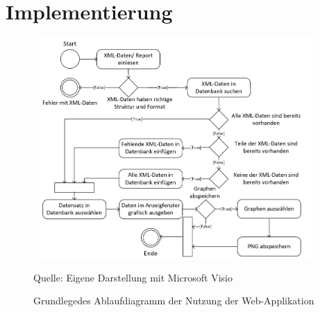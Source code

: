 
\newpage
\section{Implementierung}
\label{sec:implementierung}

\begin{figure}[H]
    \centering
    \includegraphics[width=0.95\textwidth]{Grafiken/Ablaufdiagramm}
    \caption{Grundlegedes Ablaufdiagramm der Nutzung der Web-Applikation}
    \label{fig: Grundlegedes Ablaufdiagramm der Nutzung der Web-Applikation}
    {Quelle: Eigene Darstellung mit Microsoft Visio}
\end{figure}





